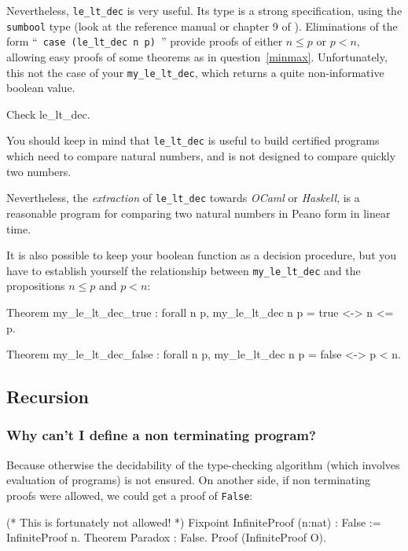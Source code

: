 \documentclass[a4paper,pdftex]{article}
\def\Question#1{\stepcounter{question}\subsubsection{#1}}
\begin{document}
Nevertheless,  \texttt{le\_lt\_dec} is very useful. Its type 
is a strong specification, using the
\texttt{sumbool} type (look at the reference manual or chapter 9 of
\cite{coqart}). Eliminations of the form
``~\texttt{case (le\_lt\_dec n p)}~'' provide proofs of
either $n \leq p$ or $p < n$, allowing easy proofs of some theorems as in
question~\ref{minmax}. Unfortunately, this not the case of your
\texttt{my\_le\_lt\_dec}, which returns a quite non-informative boolean
value.


\begin{coq_example}
Check le_lt_dec.
\end{coq_example}

You should keep in mind that \texttt{le\_lt\_dec} is useful to build
certified programs which need to compare natural numbers, and is not
designed to compare quickly two numbers.

Nevertheless, the \emph{extraction} of \texttt{le\_lt\_dec} towards 
\emph{OCaml} or \emph{Haskell}, is a reasonable program for comparing two
natural numbers in Peano form in linear time.

It is also possible to keep your boolean function as a decision procedure,
but you have to establish yourself the relationship between \texttt{my\_le\_lt\_dec} and the propositions $n\leq p$ and $p<n$:

\begin{coq_example*}
Theorem my_le_lt_dec_true : 
    forall n p, my_le_lt_dec n p = true <-> n <= p.

Theorem  my_le_lt_dec_false : 
   forall n p, my_le_lt_dec n p = false <-> p < n.
\end{coq_example*}


\subsection{Recursion}

\Question{Why can't I define a non terminating program?}

 Because otherwise the decidability of the type-checking
algorithm (which involves evaluation of programs) is not ensured.  On
another side, if non terminating proofs were allowed, we could get a
proof of {\tt False}:

\begin{coq_example*}
(* This is fortunately not allowed! *)
Fixpoint InfiniteProof (n:nat) : False := InfiniteProof n.
Theorem Paradox : False.
Proof (InfiniteProof O).
\end{coq_example*}
\end{document}
